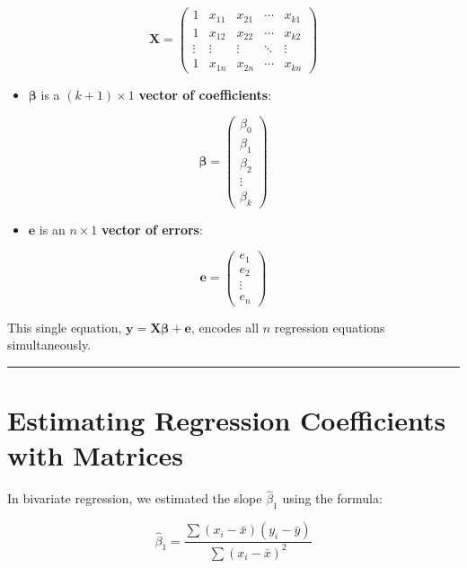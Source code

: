 \documentclass[
  letterpaper,
  DIV=11,
  numbers=noendperiod]{scrreprt}
\providecommand{\tightlist}{%
  \setlength{\itemsep}{0pt}\setlength{\parskip}{0pt}}
\begin{document}
\[
\mathbf{X} = \begin{pmatrix}
1 & x_{11} & x_{21} & \cdots & x_{k1} \\
1 & x_{12} & x_{22} & \cdots & x_{k2} \\
\vdots & \vdots & \vdots & \ddots & \vdots \\
1 & x_{1n} & x_{2n} & \cdots & x_{kn}
\end{pmatrix}
\]

\begin{itemize}
\tightlist
\item
  \(\boldsymbol{\beta}\) is a \((k+1) \times 1\) \textbf{vector of
  coefficients}:
\end{itemize}

\[
\boldsymbol{\beta} = \begin{pmatrix} \beta_0 \\ \beta_1 \\ \beta_2 \\ \vdots \\ \beta_k \end{pmatrix}
\]

\begin{itemize}
\tightlist
\item
  \(\mathbf{e}\) is an \(n \times 1\) \textbf{vector of errors}:
\end{itemize}

\[
\mathbf{e} = \begin{pmatrix} e_1 \\ e_2 \\ \vdots \\ e_n \end{pmatrix}
\]

This single equation,
\(\mathbf{y} = \mathbf{X} \boldsymbol{\beta} + \mathbf{e}\), encodes all
\(n\) regression equations simultaneously.

\begin{center}\rule{0.5\linewidth}{0.5pt}\end{center}

\section{Estimating Regression Coefficients with
Matrices}\label{estimating-regression-coefficients-with-matrices}

In bivariate regression, we estimated the slope \(\hat{\beta}_1\) using
the formula:

\[
\hat{\beta}_1 = \frac{\sum (x_i - \bar{x})(y_i - \bar{y})}{\sum (x_i - \bar{x})^2}
\]
\end{document}
